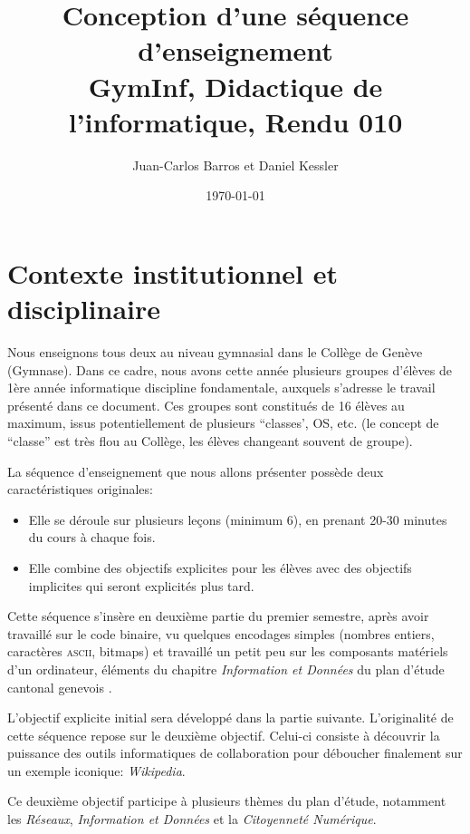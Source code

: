 \documentclass[11pt,bibliography=totoc]{scrartcl}
\author{Juan-Carlos Barros et Daniel Kessler}
\date{\today}
\title{Conception d'une séquence d'enseignement\\\medskip
  \large GymInf, Didactique de l'informatique, Rendu 010}
\begin{document}
\thispagestyle{plain}  %

\maketitle
\tableofcontents  %
\pagebreak

\section{Contexte institutionnel et disciplinaire}
Nous enseignons tous deux au niveau gymnasial dans le Collège de Genève (Gymnase). Dans ce
cadre, nous avons cette année plusieurs groupes d'élèves de 1ère année
informatique discipline fondamentale, auxquels s'adresse le travail présenté
dans ce document. Ces groupes sont constitués de 16 élèves au maximum, issus
potentiellement de plusieurs ``classes', OS, etc.  (le concept de ``classe'' est très flou
au Collège, les élèves changeant souvent de groupe).

La séquence d'enseignement que nous allons présenter possède deux
caractéristiques originales:
\begin{itemize}
\item Elle se déroule sur plusieurs leçons (minimum  6), en prenant 20-30 minutes du cours à
  chaque fois.
\item Elle combine des objectifs explicites pour les élèves avec des objectifs
  implicites qui seront explicités plus tard.
\end{itemize}

Cette séquence s'insère en deuxième partie du premier semestre, après avoir
travaillé sur le code binaire, vu quelques encodages simples (nombres entiers,
caractères \textsc{ascii}, bitmaps) et travaillé un petit peu sur les composants
matériels d'un ordinateur, éléments du chapitre \textit{Information et Données}
du plan d'étude cantonal genevois \autocite{pecinfo}.

L'objectif explicite initial sera développé dans la partie suivante. L'originalité de cette séquence 
repose sur le deuxième objectif. Celui-ci consiste à découvrir la puissance des outils informatiques 
de collaboration pour déboucher finalement sur un exemple iconique: \textit{Wikipedia}.

Ce deuxième objectif participe à plusieurs thèmes du plan d'étude, notamment les
\textit{Réseaux}, \textit{Information et Données} et la \textit{Citoyenneté
  Numérique}.
\end{document}
